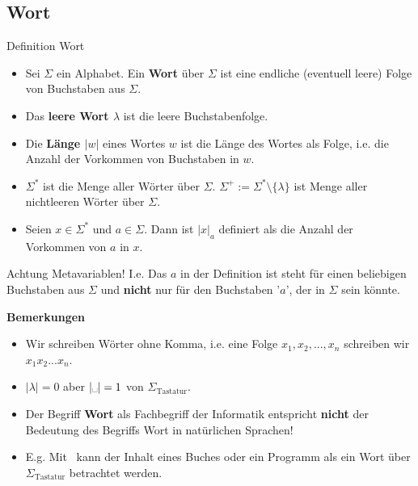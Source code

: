 \documentclass[a4paper, 11pt]{article}
\newcommand\myTitle[1]{{\large \textbf {#1}}}
\begin{document}

\subsection{Wort}


	
	\begin{mainbox}{Definition Wort}
		\begin{itemize}[label = -]
			\item Sei $\Sigma$ ein Alphabet. Ein \textbf{Wort} über $\Sigma$ ist eine endliche (eventuell leere) Folge von Buchstaben aus $\Sigma$.
			\item Das \textbf{leere Wort $\lambda$} ist die leere Buchstabenfolge.
			
			\item Die \textbf{Länge $|w|$} eines Wortes $w$ ist die Länge des Wortes als Folge, i.e. die Anzahl der Vorkommen von Buchstaben in $w$. 
			\item $\Sigma^*$ ist die Menge aller Wörter über $\Sigma$. $\Sigma^+ := \Sigma^* \setminus \{\lambda\}$ ist Menge aller nichtleeren Wörter über $\Sigma$.
			
			\item Seien $x \in \Sigma^*$ und $a \in \Sigma$. Dann ist $|x|_a$ definiert als die Anzahl der Vorkommen von $a$ in $x$.
		\end{itemize}
	 \end{mainbox}
	 Achtung Metavariablen! I.e. Das $a$ in der Definition ist steht für einen beliebigen Buchstaben aus $\Sigma$ und \textbf{nicht} nur für den Buchstaben '$a$', der in $\Sigma$ sein könnte.  



	\myTitle{Bemerkungen}
	
	\begin{itemize}[label = -]
		
		\item Wir schreiben Wörter ohne Komma, i.e. eine Folge $x_1,x_2,...,x_n$ schreiben wir $x_1x_2...x_n$.
		\item $|\lambda| = 0$ aber $|\text{\textvisiblespace}| = 1$ von $\Sigma_{\text{Tastatur}}$.
		\item Der Begriff \textbf{Wort} als Fachbegriff der Informatik entspricht \textbf{nicht} der Bedeutung des Begriffs Wort in natürlichen Sprachen!
		\item E.g. Mit \textvisiblespace \ kann der Inhalt eines Buches oder ein Programm als ein Wort über $\Sigma_{\text{Tastatur}}$ betrachtet werden.
	 \end{itemize}
	 
\end{document}
